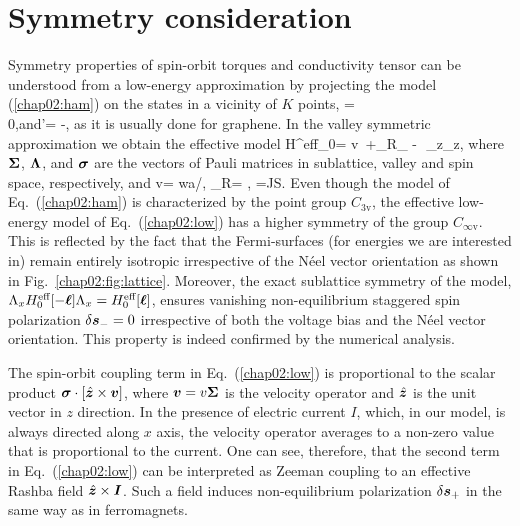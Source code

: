 \section{Symmetry consideration} 

Symmetry properties of spin-orbit torques and conductivity tensor can be understood from a low-energy approximation by projecting the model (\ref{chap02:ham}) on the states in a vicinity of $K$ points, 
\be
{}= \\ 0\epm,\quad\mbox{and}\quad {}'= -,
\e
as it is usually done for graphene. In the valley symmetric approximation we obtain the effective model
\be
\label{chap02:low}
H^\textrm{eff}_0= v\, \cdot\bb{\Sigma}+\alpha_\textrm{R}\lt[\bb{\sigma}\times\bb{\Sigma}\rt]_{} - \Delta\,\bb{\ell}\cdot\bb{\sigma}\,\Sigma_z\Lambda_z,
\e
where $\boldsymbol{\Sigma}$, $\boldsymbol{\Lambda}$, and $\boldsymbol{\sigma}$ are the vectors of Pauli matrices in sublattice, valley and spin space, respectively, and 
\be
v=  wa/\hslash, \qquad \alpha_\textrm{R}=  \lambda , \qquad \Delta=JS.
\e
Even though the model of Eq.~(\ref{chap02:ham}) is characterized by the point group $C_\textrm{3v}$, the effective low-energy model of Eq.~(\ref{chap02:low}) has a higher symmetry 
of the group $C_{\infty\textrm{v}}$. This is reflected by the fact that the Fermi-surfaces (for energies we are interested in) remain entirely isotropic irrespective of the N\'eel vector orientation as shown in Fig.~\ref{chap02:fig:lattice}. Moreover, the exact sublattice symmetry of the model, $\Lambda_x H^\textrm{eff}_0[-\boldsymbol{\ell}] \Lambda_x =H^\textrm{eff}_0[\boldsymbol{\ell}]$, ensures vanishing non-equilibrium staggered spin polarization $\delta \boldsymbol{s}_-=0$ irrespective of both the voltage bias and the N\'eel vector orientation. This property is indeed confirmed by the numerical analysis. 

The spin-orbit coupling term in Eq.~(\ref{chap02:low}) is proportional to the scalar product $\boldsymbol{\sigma}\cdot \left[\hat{\boldsymbol{z}}\times \boldsymbol{v}\right]$, where $\boldsymbol{v}=v\boldsymbol{\Sigma}$ is the velocity operator and $\hat{\boldsymbol{z}}$ is the unit vector in $z$ direction. In the presence of electric current $I$, which, in our model, is always directed along $x$ axis, the velocity operator averages to a non-zero value that is proportional to the current. One can see, therefore, that the second term in Eq.~(\ref{chap02:low}) can be interpreted as Zeeman coupling to an effective Rashba field $\hat{\boldsymbol{z}}\times \boldsymbol{I}$. Such a field induces non-equilibrium polarization $\delta\boldsymbol{s}_+$ in the same way as in ferromagnets. 

